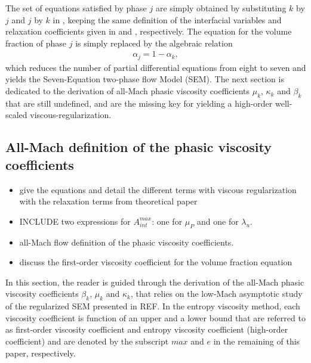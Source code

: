 \documentclass[preprint,10pt]{elsarticle}
\begin{document}
The set of equations satisfied by phase $j$ are simply obtained by substituting $k$ by $j$ and $j$ by $k$ in , keeping 
the same definition of the interfacial variables and relaxation coefficients given in  and , respectively. The equation for the volume fraction of phase $j$ is simply replaced by the algebraic relation
%
\begin{align}
 \alpha_{j}= 1 - \alpha_{k}, \nonumber
\end{align}
%
which reduces the number of partial differential equations from eight to seven and yields the Seven-Equation two-phase flow Model (SEM). The next section is dedicated to the derivation of all-Mach phasic viscosity coefficients $\mu_k$, $\kappa_k$ and $\beta_k$ that are still undefined, and are the missing key for yielding a high-order well-scaled viscous-regularization.
%
\subsection{All-Mach definition of the phasic viscosity coefficients}\label{sec:visc-def}
%
\begin{itemize}
\item give the equations and detail the different terms with viscous regularization with the relaxation terms from theoretical paper
\item INCLUDE two expressions for $A_{int}^{max}$: one for $\mu_P$ and one for $\lambda_u$.
\item all-Mach flow definition of the phasic viscosity coefficients.
\item discuss the first-order viscosity coefficient for the volume fraction equation
\end{itemize}
%
In this section, the reader is guided through the derivation of the all-Mach phasic viscosity coefficients $\beta_k$, $\mu_k$ and $\kappa_k$, that relies on the low-Mach asymptotic study of the regularized SEM presented in REF. In the entropy viscosity method, each viscosity coefficient is function of an upper and a lower bound that are referred to as first-order viscosity coefficient and entropy viscosity coefficient (high-order coefficient) and are denoted by the subscript $max$ and $e$ in the remaining of this paper, respectively. 
%
\end{document}
